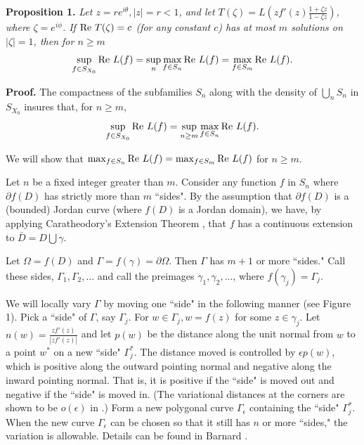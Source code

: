\documentclass[final]{siamltex}
\begin{document}
\vspace{0.1in}

{\bf Proposition 1.} {\em Let $z = re^{i \theta}, |z| = r < 1$, and let $T(\zeta) = L \left ( z f'(z) \frac{1+\zeta z}{1-\zeta z} \right )$, where
$\zeta = e^{i \phi}$.  If ${\rm Re } \  T(\zeta) = c$ (for any constant $c$) has at most $m$ solutions on $|\zeta| = 1$, 
then for $n \geq m$
$$\sup \limits_{f \in S_{X_0}} {\rm Re} \  L(f) = \sup \limits_n \max \limits_{f \in S_n} {\rm Re} \  L(f) = \max \limits_{f \in S_m} {\rm Re} \  L(f).$$
}

{\bf Proof.}  The compactness of the subfamilies $S_n$ along with the density of $\bigcup_n S_n$ in $S_{X_0}$ 
insures that, for $n \geq m$, 
$$\sup \limits_{f \in S_{X_0}} {\rm Re} \  L(f) = \sup \limits_{n \geq m} \max \limits_{f \in S_n} {\rm Re} \  L(f).$$

We will show that $\max_{f \in S_n} {\rm Re} \  L(f) = \max_{f \in S_m} {\rm Re} \  L(f)$ for $n \geq m$.

Let $n$ be a fixed integer greater than $m$.  Consider any function $f$ in $S_n$ where $\partial f(D)$ has strictly more than $m$ ``sides".  By the 
assumption that $\partial f(D)$ is a (bounded) Jordan curve (where $f(D)$ is a Jordan domain), we have, by applying Caratheodory's Extension
Theorem \cite{Duren1}, that $f$ has a continuous extension to $\bar{D} = D \bigcup \gamma$.

Let $\Omega = f(D)$ and $\Gamma = f(\gamma) = \partial \Omega$.  Then $\Gamma$ has $m+1$ or more ``sides."  Call these sides, $\Gamma_1, \Gamma_2, . . . $ and call the
preimages $\gamma_1, \gamma_2, . . .$, where $f(\gamma_j) = \Gamma_j$.

We will locally vary $\Gamma$ by moving one ``side" in the following manner (see Figure 1).  Pick a ``side" of $\Gamma$, say $\Gamma_j$.  
For $w \in \Gamma_j, w = f(z)$ for some $z \in \gamma_j$.  Let $n(w) = \frac{zf'(z)}{|zf'(z)|}$ and let $p(w)$ be the distance
along the unit normal from $w$ to a point $w^*$ on a new ``side" $\Gamma_j^*$.  The distance moved is controlled by $\epsilon p(w)$, which is 
positive along the outward pointing normal and negative along the inward pointing normal.  That is, it is positive if the ``side" is moved out
and negative if the ``side" is moved in.  (The variational distances at the corners are shown to be $o(\epsilon)$ in \cite{BarnardLewis1}.)  Form a new polygonal curve
$\Gamma_\epsilon$ containing the ``side" $\Gamma_j^*$.  When the new curve $\Gamma_\epsilon$ can be chosen so that it still has $n$ or more ``sides,"
the variation is allowable.  Details can be found in Barnard \cite{Barnard2}.
\end{document}
